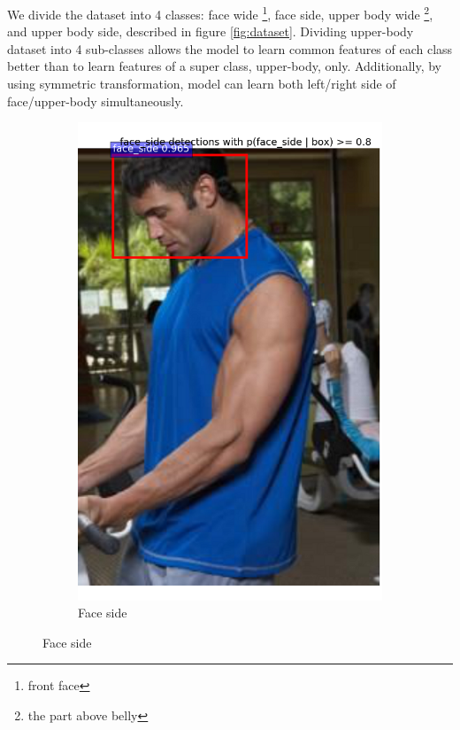 \documentclass[conference]{IEEEtran}
\begin{document}
We divide the dataset into 4 classes: face wide \footnote{front face}, face side, upper body wide \footnote{the part above belly}, and upper body side, described in figure \ref{fig:dataset}. Dividing upper-body dataset into 4 sub-classes allows the model to learn common features of each class better than to learn features of a super class, upper-body, only. Additionally, by using symmetric transformation, model can learn both left/right side of face/upper-body simultaneously.
\begin{figure}
	\centering
	\begin{subfigure}[b]{0.24\textwidth}
		\includegraphics[width=\textwidth]{face_side}
		\caption{Face side}
		\label{fig:fs}
	\end{subfigure}

\end{figure}
\end{document}
